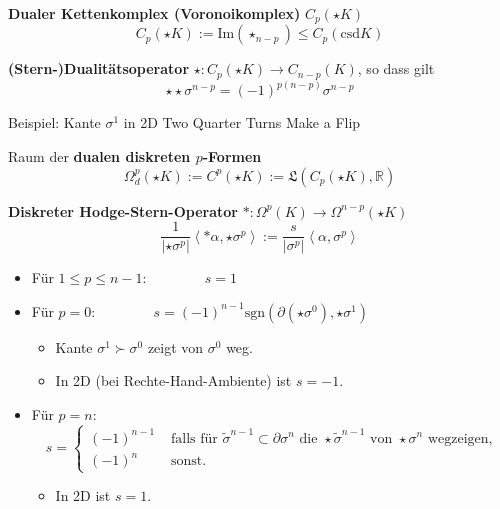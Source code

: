 \documentclass{beamer}
\newcommand{\R}{\mathds{R}}
\newcommand{\qqquad}{\qquad\qquad}
\begin{document}
  \begin{frame}
    \begin{block}{\textbf{Dualer Kettenkomplex (Voronoikomplex)} \( C_{p}(\star K) \)}
      \[ C_{p}(\star K) := \text{Im}(\star_{n-p}) \le C_{p}(\text{csd}K) \]
    \end{block}
    \pause
    \begin{block}{\textbf{(Stern-)Dualitätsoperator} \( \star: C_{p}(\star K) \longrightarrow C_{n-p}(K)\), so dass gilt}
      \[ \star\star \sigma^{n-p} = (-1)^{p(n-p)}\sigma^{n-p}\]
    \end{block}
    \pause
    \begin{block}{Beispiel: Kante \( \sigma^{1} \) in 2D}
      \glqq Two Quarter Turns Make a Flip \grqq
    \end{block}
    \pause
    \begin{block}{Raum der \textbf{dualen diskreten \( p \)-Formen} }
      \[ \Omega^{p}_{d}(\star K) := C^{p}(\star K) := \mathfrak{L}(C_{p}(\star K), \R) \]
    \end{block}
  \end{frame}

  \begin{frame}
    \begin{block}{\textbf{Diskreter Hodge-Stern-Operator} \( *: \Omega^{p}(K) \longrightarrow \Omega^{n-p}(\star K)\)}
      \pause
      \[ \frac{1}{|\star\sigma^{p}|} \left\langle *\alpha , \star\sigma^{p} \right\rangle := \frac{s}{|\sigma^{p}|} \left\langle \alpha , \sigma^{p} \right\rangle\]
      \pause
      \begin{itemize}
        \item Für \( 1 \le p \le n-1: \qqquad s = 1 \)
        \item Für \( p = 0: \qqquad s = (-1)^{n-1} \text{sgn} \left( \partial(\star\sigma^{0}), \star\sigma^{1} \right) \)
              \begin{itemize}
                \item Kante \( \sigma^{1} \succ \sigma^{0} \) zeigt von \( \sigma^{0} \) weg.
                \item In 2D (bei Rechte-Hand-Ambiente) ist \( s = -1 \).
              \end{itemize}
              \item Für \( p = n:\)      
     \[s = \begin{cases} (-1)^{n-1} & \text{ falls für } \tilde{\sigma}^{n-1} \subset \partial \sigma^{n} \text { die } \star\tilde{\sigma}^{n-1} \text{ von } \star\sigma^{n} \text{ wegzeigen,} \\
                         (-1)^{n} & \text{ sonst.}
           \end{cases}\]
                \begin{itemize}
                  \item In 2D ist \( s = 1 \).
                \end{itemize}
      \end{itemize}
    \end{block}
  \end{frame}
\end{document}
